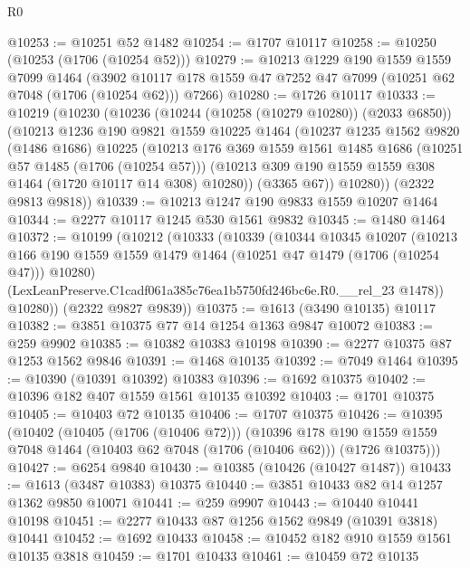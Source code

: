 \begin{lexlean}{R0}
\begin{coremodule}
@10253 := @10251 @52 @1482
@10254 := @1707 @10117
@10258 := @10250 (@10253 (@1706 (@10254 @52)))
@10279 := @10213
    @1229
    @190
    @1559
    @1559
    @7099
    @1464
    (@3902 @10117 @178 @1559 @47 @7252 @47 @7099 (@10251 @62 @7048 (@1706 (@10254 @62))) @7266)
@10280 := @1726 @10117
@10333 := @10219
    (@10230
      (@10236
        (@10244 (@10258 (@10279 @10280)) (@2033 @6850))
        (@10213
          @1236
          @190
          @9821
          @1559
          @10225
          @1464
          (@10237
            @1235
            @1562
            @9820
            (@1486 @1686)
            @10225
            (@10213
              @176
              @369
              @1559
              @1561
              @1485
              @1686
              (@10251 @57 @1485 (@1706 (@10254 @57)))
              (@10213 @309 @190 @1559 @1559 @308 @1464 (@1720 @10117 @14 @308) @10280))
            (@3365 @67))
          @10280))
      (@2322 @9813 @9818))
@10339 := @10213 @1247 @190 @9833 @1559 @10207 @1464
@10344 := @2277 @10117 @1245 @530 @1561 @9832
@10345 := @1480 @1464
@10372 := @10199
    (@10212
      (@10333
        (@10339
          (@10344
            @10345
            @10207
            (@10213
              @166
              @190
              @1559
              @1559
              @1479
              @1464
              (@10251 @47 @1479 (@1706 (@10254 @47)))
              @10280)
            (LexLeanPreserve.C1cadf061a385c76ea1b5750fd246bc6e.R0.__rel_23 @1478))
          @10280))
      (@2322 @9827 @9839))
@10375 := @1613 (@3490 @10135) @10117
@10382 := @3851 @10375 @77 @14 @1254 @1363 @9847 @10072
@10383 := @259 @9902
@10385 := @10382 @10383 @10198
@10390 := @2277 @10375 @87 @1253 @1562 @9846
@10391 := @1468 @10135
@10392 := @7049 @1464
@10395 := @10390 (@10391 @10392) @10383
@10396 := @1692 @10375
@10402 := @10396 @182 @407 @1559 @1561 @10135 @10392
@10403 := @1701 @10375
@10405 := @10403 @72 @10135
@10406 := @1707 @10375
@10426 := @10395
    (@10402
      (@10405 (@1706 (@10406 @72)))
      (@10396
        @178
        @190
        @1559
        @1559
        @7048
        @1464
        (@10403 @62 @7048 (@1706 (@10406 @62)))
        (@1726 @10375)))
@10427 := @6254 @9840
@10430 := @10385 (@10426 (@10427 @1487))
@10433 := @1613 (@3487 @10383) @10375
@10440 := @3851 @10433 @82 @14 @1257 @1362 @9850 @10071
@10441 := @259 @9907
@10443 := @10440 @10441 @10198
@10451 := @2277 @10433 @87 @1256 @1562 @9849 (@10391 @3818) @10441
@10452 := @1692 @10433
@10458 := @10452 @182 @910 @1559 @1561 @10135 @3818
@10459 := @1701 @10433
@10461 := @10459 @72 @10135

\end{coremodule}
\end{lexlean}
